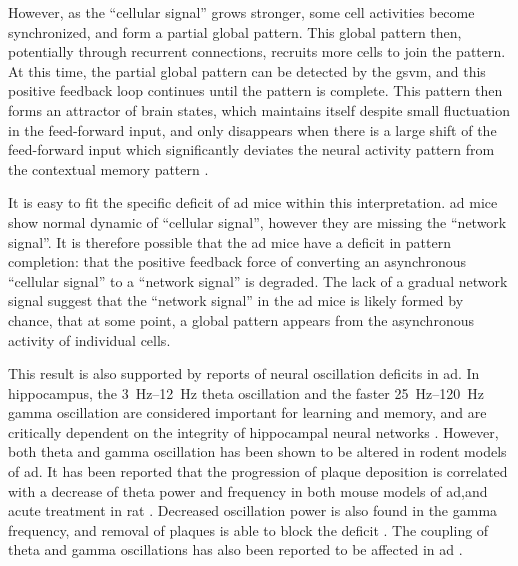 However, as the ``cellular signal'' grows stronger, some cell activities become synchronized, and form a partial global pattern. This global pattern then, potentially through recurrent connections, recruits more cells to join the pattern. At this time, the partial global pattern can be detected by the \gls{gsvm}, and this positive feedback loop continues until the pattern is complete. This pattern then forms an attractor of brain states, which maintains itself despite small fluctuation in the feed-forward input, and only disappears when there is a large shift of the feed-forward input which significantly deviates the neural activity pattern from the contextual memory pattern \citep{rolls13}. 

It is easy to fit the specific deficit of \gls{ad} mice within this interpretation. \gls{ad} mice show normal dynamic of ``cellular signal'', however they are missing the ``network signal''. It is therefore possible that the \gls{ad} mice have a deficit in pattern completion: that the positive feedback force of converting an asynchronous ``cellular signal'' to a ``network signal'' is degraded. The lack of a gradual network signal suggest that the ``network signal'' in the \gls{ad} mice is likely formed by chance, that at some point, a global pattern appears from the asynchronous activity of individual cells. 


This result is also supported by reports of neural oscillation deficits in \gls{ad}. In hippocampus, the \SIrange{3}{12}{\hertz} theta oscillation and the faster \SIrange{25}{120}{\hertz} gamma oscillation are considered important for learning and memory, and are critically dependent on the integrity of hippocampal neural networks \citep{buzsaki02, colgin09}. However, both theta and gamma oscillation has been shown to be altered in rodent models of \gls{ad}. It has been reported that the progression of plaque deposition is correlated with a decrease of theta power and frequency in both mouse models of \gls{ad},and acute \abeta{} treatment in rat \citep{scott12, villette10}. Decreased oscillation power is also found in the gamma frequency, and removal of \abeta{} plaques is able to block the deficit \citep{driver07, kurudenkandy14}. The coupling of theta and gamma oscillations has also been reported to be affected in \gls{ad} \citep{goutagny13}. 

